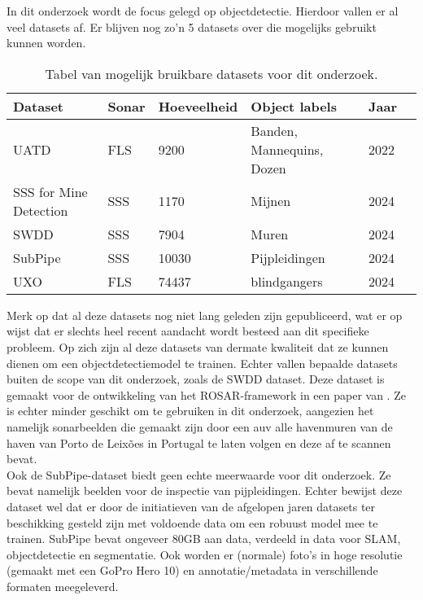 In dit onderzoek wordt de focus gelegd op objectdetectie. Hierdoor vallen er al veel datasets af. Er blijven nog zo'n 5 datasets over die mogelijks gebruikt kunnen worden. \\

\begin{table}
    \centering
    \begin{tabular}{llllll}
        \toprule
        \textbf{Dataset} & \textbf{Sonar} & \textbf{Hoeveelheid} & \textbf{Object labels} & \textbf{Jaar} \\
        \midrule
        UATD                   & FLS & 9200  & Banden, Mannequins, Dozen & 2022 \\
        SSS for Mine Detection & SSS & 1170  & Mijnen                    & 2024 \\
        SWDD                   & SSS & 7904  & Muren                     & 2024 \\
        SubPipe                & SSS & 10030 & Pijpleidingen             & 2024 \\
        UXO                    & FLS & 74437 & \Glspl{blindganger}       & 2024 \\
        \bottomrule
    \end{tabular}
    \caption[Mogelijke datasets]{\label{tab:possible_datasets} Tabel van mogelijk bruikbare datasets voor dit onderzoek.}
\end{table}

Merk op dat al deze datasets nog niet lang geleden zijn gepubliceerd, wat er op wijst dat er slechts heel recent aandacht wordt besteed aan dit specifieke probleem. Op zich zijn al deze datasets van dermate kwaliteit dat ze kunnen dienen om een objectdetectiemodel te trainen. Echter vallen bepaalde datasets buiten de scope van dit onderzoek, zoals de SWDD dataset. Deze dataset is gemaakt voor de ontwikkeling van het ROSAR-framework in een paper van \textcite{Aubard_2024_ROSAR}. Ze is echter minder geschikt om te gebruiken in dit onderzoek, aangezien het namelijk sonarbeelden die gemaakt zijn door een \gls{auv} alle havenmuren van de haven van Porto de Leixões in Portugal te laten volgen en deze af te scannen bevat. \autocite{Aubard_2024_SWDD} \\

Ook de SubPipe-dataset biedt geen echte meerwaarde voor dit onderzoek. Ze bevat namelijk beelden voor de inspectie van pijpleidingen. Echter bewijst deze dataset wel dat er door de initiatieven van de afgelopen jaren datasets ter beschikking gesteld zijn met voldoende data om een robuust model mee te trainen. SubPipe bevat ongeveer 80GB aan data, verdeeld in data voor SLAM, objectdetectie en segmentatie. Ook worden er (normale) foto's in hoge resolutie (gemaakt met een GoPro Hero 10) en annotatie/metadata in verschillende formaten meegeleverd. \autocite{Alvarez_Tunon_2024} \\

